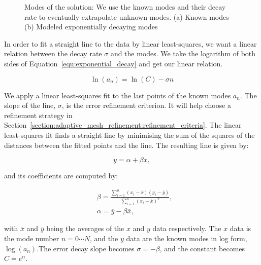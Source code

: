 \begin{figure}[H]
	\centering
	\hfill
	\caption{Modes of the solution: We use the known modes and their decay rate to eventually
	extrapolate unknown modes. (a) Known modes (b) Modeled exponentially decaying modes}\label{fig:sin_modes}
\end{figure}

In order to fit a straight line to the data by linear least-squares, we want a linear relation
between the decay rate \(\sigma \) and the modes. We take the logarithm of both sides of
Equation~\ref{equ:exponential_decay} and get our linear relation.

\begin{equation} \label{equ:exponential_decay_linear}
	\ln(a_n) = \ln(C) - \sigma n
\end{equation}

\noindent
We apply a linear least-squares fit to the last points of the known modes \(a_n\). The slope of the
line, \(\sigma \), is the error refinement criterion. It will help choose a refinement strategy in
Section~\ref{section:adaptive_mesh_refinement:refinement_criteria}. The linear least-squares fit
finds a straight line by minimising the sum of the squares of the distances between the fitted
points and the line. The resulting line is given by:

\begin{equation}
	y = \alpha + \beta x,
\end{equation}

\noindent
and its coefficients are computed by:

\begin{align}
	& \beta = \frac{\sum_{i = 1}^{n}(x_i - \overline{x})(y_i - \overline{y})}{\sum_{i = 1}^{n}{(x_i -\overline{x})}^2}, \\
	& \alpha = \overline{y} - \beta \overline{x},
\end{align}

\noindent
with \(\overline{x}\) and \(\overline{y}\) being the averages of the \(x\) and \(y\) data
respectively. The \(x\) data is the mode number \(n = 0 \cdots N\), and the \(y\) data are the known
modes in log form, \( \log(a_n) \).The error decay slope becomes \(\sigma = - \beta \), and the constant becomes \(C =
e^\alpha \).

